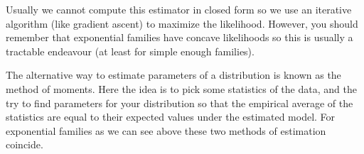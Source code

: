\documentclass[twoside,12pt]{article}
\begin{document}
Usually we cannot compute this estimator in closed form so we use an iterative algorithm (like gradient ascent) to maximize the likelihood. However, you should remember that exponential families have concave likelihoods so this is usually a tractable endeavour (at least for simple enough families).

The alternative way to estimate parameters of a distribution is known as the method of moments. Here the idea is to pick some statistics of the data, and the try to find parameters for your distribution so that the empirical average of the statistics are equal to their expected values under the estimated model. For exponential families as we can see above these two methods of estimation coincide. 
\end{document}
